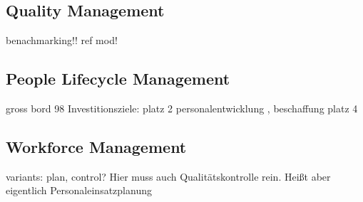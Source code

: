 	\subsection{Quality Management}
		\label{sec:qualmang}
	benachmarking!! ref mod!
	\subsection{People Lifecycle Management}
		\label{sec:plmang}
	
	gross bord 98
	Investitionsziele: platz 2 personalentwicklung \citep{ccnet2016}, beschaffung platz 4
	\subsection{Workforce Management}
		\label{sec:wofom}
	variants: plan, control?
	Hier muss auch Qualitätskontrolle rein. Heißt aber eigentlich Personaleinsatzplanung
	
